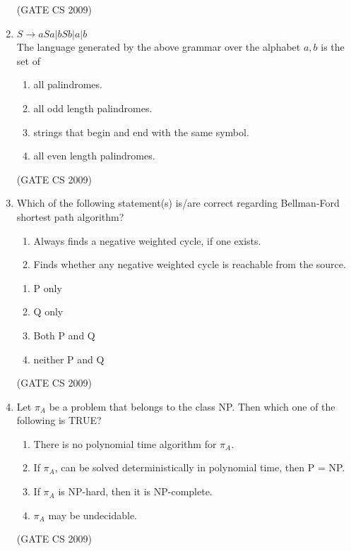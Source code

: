 \documentclass[a4paper, 11pt]{article}
\begin{document}
\begin{enumerate}
    \hfill (GATE CS 2009)

    \item $S \rightarrow aSa | bSb| a | b$\\The language generated by the above grammar over the alphabet ${a, b}$ is the set of
    \begin{enumerate} 
        \item all palindromes.
        \item all odd length palindromes.
        \item strings that begin and end with the same symbol.
        \item all even length palindromes.
    \end{enumerate}

    \hfill (GATE CS 2009)

    \item Which of the following statement(s) is/are correct regarding Bellman-Ford shortest path algorithm?
    \begin{enumerate}[label= \Alph*, start=16]
        \item Always finds a negative weighted cycle, if one exists.
        \item Finds whether any negative weighted cycle is reachable from the source.
    \end{enumerate}
    \begin{enumerate} 
        \item P only
        \item Q only
        \item Both P and Q
        \item neither P and Q
    \end{enumerate}

    \hfill (GATE CS 2009)

    \item Let $\pi_A$ be a problem that belongs to the class NP. Then which one of the following is TRUE?
    \begin{enumerate}
        \item There is no polynomial time algorithm for $\pi_A$.
        \item If $\pi_A$, can be solved deterministically in polynomial time, then P = NP.
        \item If $\pi_A$ is NP-hard, then it is NP-complete.
        \item $\pi_A$ may be undecidable.
    \end{enumerate}

    \hfill (GATE CS 2009)


\end{enumerate}
\end{document}
